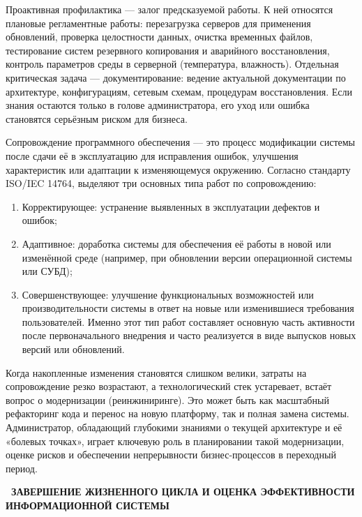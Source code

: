 \documentclass{SibFU-docs}
\begin{document}
Проактивная профилактика — залог предсказуемой работы. К ней относятся плановые регламентные работы: перезагрузка серверов для применения обновлений, проверка целостности данных, очистка временных файлов, тестирование систем резервного копирования и аварийного восстановления, контроль параметров среды в серверной (температура, влажность). Отдельная критическая задача — документирование: ведение актуальной документации по архитектуре, конфигурациям, сетевым схемам, процедурам восстановления. Если знания остаются только в голове администратора, его уход или ошибка становятся серьёзным риском для бизнеса.


Сопровождение программного обеспечения — это процесс модификации системы после сдачи её в эксплуатацию для исправления ошибок, улучшения характеристик или адаптации к изменяющемуся окружению. Согласно стандарту ISO/IEC 14764, выделяют три основных типа работ по сопровождению:

\begin{enumerate}
    \item Корректирующее: устранение выявленных в эксплуатации дефектов и ошибок;
    \item Адаптивное: доработка системы для обеспечения её работы в новой или изменённой среде (например, при обновлении версии операционной системы или СУБД);
    \item Совершенствующее: улучшение функциональных возможностей или производительности системы в ответ на новые или изменившиеся требования пользователей. Именно этот тип работ составляет основную часть активности после первоначального внедрения и часто реализуется в виде выпусков новых версий или обновлений. \cite{ISO12207_2017, pressman2014se}
\end{enumerate}

Когда накопленные изменения становятся слишком велики, затраты на сопровождение резко возрастают, а технологический стек устаревает, встаёт вопрос о модернизации (реинжиниринге). Это может быть как масштабный рефакторинг кода и перенос на новую платформу, так и полная замена системы. Администратор, обладающий глубокими знаниями о текущей архитектуре и её «болевых точках», играет ключевую роль в планировании такой модернизации, оценке рисков и обеспечении непрерывности бизнес-процессов в переходный период.

\newpage
{}
\begin{center}\textbf{\thesection\ ЗАВЕРШЕНИЕ ЖИЗНЕННОГО ЦИКЛА И ОЦЕНКА ЭФФЕКТИВНОСТИ ИНФОРМАЦИОННОЙ СИСТЕМЫ}\end{center}
\vspace*{-1.5em}
\end{document}
